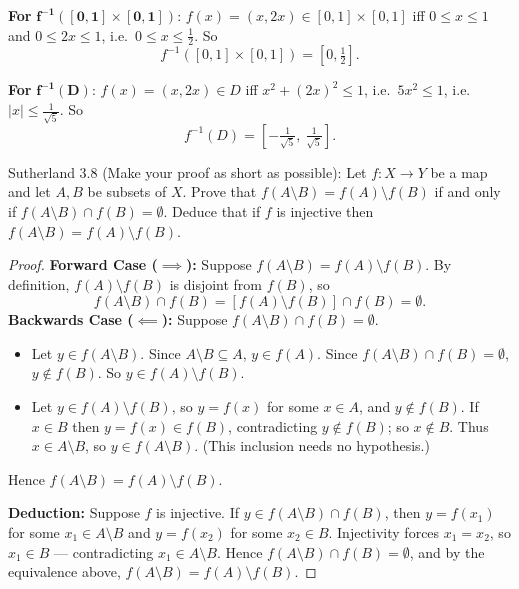 \documentclass{homework}
\begin{document}
\begin{problems}
\textbf{For} $\mathbf{f^{-1}([0,1]\times[0,1])}$: $f(x) = (x,2x) \in [0,1]\times[0,1]$ iff $0 \le x \le 1$ and $0 \le 2x \le 1$, i.e.\ $0 \le x \le \tfrac12$. So
\[
f^{-1}([0,1]\times[0,1]) = \left[0, \tfrac12\right].
\]

\textbf{For} $\mathbf{f^{-1}(D)}$: $f(x) = (x,2x) \in D$ iff $x^2 + (2x)^2 \le 1$, i.e.\ $5x^2 \le 1$, i.e.\ $|x| \le \tfrac{1}{\sqrt5}$. So
\[
f^{-1}(D) = \left[-\tfrac{1}{\sqrt5},\ \tfrac{1}{\sqrt5}\right].
\]

\problem Sutherland 3.8 (Make your proof as short as possible): 
Let $f : X \to Y$ be a map and let $A, B$ be subsets of $X$. Prove
that $f(A \setminus B) = f(A) \setminus f(B)$ if and only if $f(A \setminus B) \cap f(B) = \emptyset$.
Deduce that if $f$ is injective then $f(A \setminus B) = f(A) \setminus f(B)$.
\solution
  \begin{proof}
$ $\newline \textbf{Forward Case ($\implies$):} Suppose $f(A\setminus B) = f(A)\setminus f(B)$. By definition, $f(A)\setminus f(B)$ is disjoint from $f(B)$, so
    \[
    f(A \setminus B) \cap f(B) = \left[f(A)\setminus f(B)\right] \cap f(B) = \emptyset.
    \]
    \textbf{Backwards Case ($\impliedby$):} Suppose $f(A\setminus B) \cap f(B) = \emptyset$.
    \begin{itemize}
      \item[$\subseteq$:] Let $y \in f(A\setminus B)$. Since $A\setminus B \subseteq A$, $y \in f(A)$. Since $f(A\setminus B) \cap f(B) = \emptyset$, $y \notin f(B)$. So $y \in f(A)\setminus f(B)$.
      \item[$\supseteq$:] Let $y \in f(A)\setminus f(B)$, so $y = f(x)$ for some $x \in A$, and $y \notin f(B)$. If $x \in B$ then $y = f(x) \in f(B)$, contradicting $y \notin f(B)$; so $x \notin B$. Thus $x \in A\setminus B$, so $y \in f(A\setminus B)$. (This inclusion needs no hypothesis.)
    \end{itemize}
    Hence $f(A\setminus B) = f(A)\setminus f(B)$.

    \textbf{Deduction:} Suppose $f$ is injective. If $y \in f(A\setminus B) \cap f(B)$, then $y = f(x_1)$ for some $x_1 \in A\setminus B$ and $y = f(x_2)$ for some $x_2 \in B$. Injectivity forces $x_1 = x_2$, so $x_1 \in B$ — contradicting $x_1 \in A \setminus B$. Hence $f(A\setminus B)\cap f(B) = \emptyset$, and by the equivalence above, $f(A\setminus B) = f(A)\setminus f(B)$.
\end{proof}

\end{problems}
\end{document}
